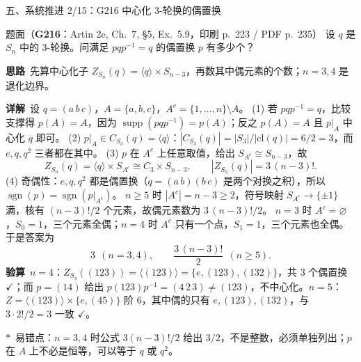 \documentclass[aspectratio=169,10pt,fontset=none]{ctexbeamer}
\newcommand{\ex}[1]{\textcolor{accent}{\footnotesize\bfseries #1}}
\newcommand{\key}[1]{\textcolor{ink}{\bfseries #1}}
\newcommand{\starpt}{\textcolor{accent}{\bfseries$\ast$}}
\begin{document}
\begin{frame}[t]{五、系统推进 2/15：G216 中心化 3-轮换的偶置换}
\label{ex:G216}
\scriptsize
\begin{block}{\footnotesize 题面（\ex{G216}：Artin 2e, Ch.~7, \S5, Ex.~5.9，印刷 p.~223 / PDF p.~235）}
设 $q$ 是 $S_n$ 中的 $3$-轮换。问满足 $pqp^{-1}=q$ 的偶置换 $p$ 有多少个？
\end{block}
\vspace{-0.6mm}
\key{思路}\ 先算中心化子 $Z_{S_n}(q)=\langle q\rangle\times S_{n-3}$，再数其中偶元素的个数；$n=3,4$ 是退化边界。

\key{详解}\ 设 $q=(a\,b\,c)$，$A=\{a,b,c\}$，$A^c=\{1,\dots,n\}\setminus A$。
(1) 若 $pqp^{-1}=q$，比较支撑得 $p(A)=A$，因为 $\operatorname{supp}(pqp^{-1})=p(A)$；反之 $p(A)=A$ 且 $p|_A$ 中心化 $q$ 即可。
(2) $p|_A\in C_{S_3}(q)=\langle q\rangle$：$|C_{S_3}(q)|=|S_3|/|\mathrm{cl}(q)|=6/2=3$，而 $e,q,q^2$ 三者都在其中。
(3) $p$ 在 $A^c$ 上任意取值，给出 $S_{A^c}\cong S_{n-3}$，故
\[
Z_{S_n}(q)=\langle q\rangle\times S_{A^c}\cong C_3\times S_{n-3},\qquad |Z_{S_n}(q)|=3\,(n-3)!.
\]
(4) 奇偶性：$e,q,q^2$ 都是偶置换（$q=(a\,b)(b\,c)$ 是两个对换之积），所以 $\operatorname{sgn}(p)=\operatorname{sgn}(p|_{A^c})$。
$n\ge5$ 时 $|A^c|=n-3\ge2$，符号映射 $S_{A^c}\to\{\pm1\}$ 满，核有 $(n-3)!/2$ 个元素，故偶元素数为 $3\,(n-3)!/2$。
$n=3$ 时 $A^c=\varnothing$，$S_0=1$，三个元素全偶；$n=4$ 时 $A^c$ 只有一个点，$S_1=1$，三个元素也全偶。于是答案为
\[
3\ \ (n=3,4),\qquad \frac{3\,(n-3)!}{2}\ \ (n\ge5).
\]
\key{验算}\ $n=4$：$Z_{S_4}((123))=\langle(123)\rangle=\{e,(123),(132)\}$，共 $3$ 个偶置换 $\checkmark$；而 $p=(14)$ 给出 $p(123)p^{-1}=(4\,2\,3)\ne(123)$，不中心化。$n=5$：$Z=\langle(123)\rangle\times\{e,(45)\}$ 阶 $6$，其中偶的只有 $e,(123),(132)$，与 $3\cdot 2!/2=3$ 一致 $\checkmark$。

\starpt\ 易错点：$n=3,4$ 时公式 $3(n-3)!/2$ 给出 $3/2$，不是整数，必须单独列出；$p$ 在 $A$ 上不必是恒等，可以等于 $q$ 或 $q^2$。
\end{frame}
\end{document}
